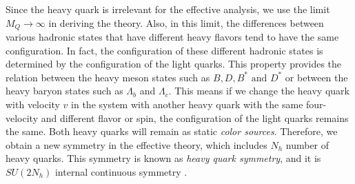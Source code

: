 Since the heavy quark is irrelevant for the effective analysis, we use the limit $M_Q\rightarrow \infty$ in deriving the theory. Also, in this limit, the differences between various hadronic states that have different heavy flavors tend to have the same configuration. In fact, the configuration of these different hadronic states is determined by the configuration of the light quarks. This property provides the relation between the heavy meson states such as $B, D, B^{*} \text { and } D^{*}$ or between the heavy baryon states such as $\Lambda_b$ and $\Lambda_c$. This means if we change the heavy quark with velocity $v$ in the system with another heavy quark with the same four-velocity and different flavor or spin, the configuration of the light quarks remains the same. Both heavy quarks will remain as static \textit{color sources}. Therefore, we obtain a new symmetry in the effective theory, which includes $N_h$ number of heavy quarks. This symmetry is known as \textit{heavy quark symmetry}, and it is $SU(2N_h)$ internal continuous symmetry \cite{Neubert:1997gu}.  

